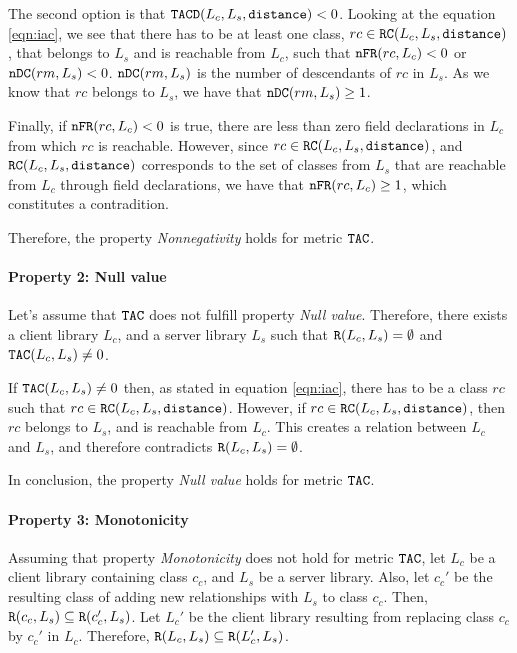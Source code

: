 The second option is that $\verb|TACD|(L_c,L_s, \verb|distance|) < 0$. Looking at the equation \ref{eqn:iac}, we see that there has to be at least one class, $rc \in \verb|RC|(L_c,L_s,\verb|distance|)$, that belongs to $L_s$ and is reachable from $L_c$, such that $\verb|nFR|(rc,L_c) < 0$ or $\verb|nDC|(rm, L_s) < 0$. $\verb|nDC|(rm, L_s)$ is the number of descendants of $rc$ in $L_s$. As we know that $rc$ belongs to $L_s$, we have that $\verb|nDC|(rm, L_s) \geq 1$.

Finally, if $\verb|nFR|(rc,L_c) < 0$ is true, there are less than zero field declarations in $L_c$ from which $rc$ is reachable. However, since $rc \in \verb|RC|(L_c,L_s,\verb|distance|)$, and $\verb|RC|(L_c,L_s,\verb|distance|)$ corresponds to the set of classes from $L_s$ that are reachable from $L_c$ through field declarations, we have that $\verb|nFR|(rc,L_c) \geq 1$, which constitutes a contradition.

Therefore, the property \textit{Nonnegativity} holds for metric $\verb|TAC|$.

\paragraph{Property 2: Null value}
Let's assume that $\verb|TAC|$ does not fulfill property \textit{Null value}. Therefore, there exists a client library $L_c$, and a server library $L_s$ such that $\verb|R|(L_c, L_s) = \emptyset$ and $\verb|TAC|(L_c, L_s) \neq 0$.

If $\verb|TAC|(L_c, L_s) \neq 0$ then, as stated in equation \ref{eqn:iac}, there has to be a class $rc$ such that  $rc \in \verb|RC|(L_c,L_s,\verb|distance|)$. However, if $rc \in \verb|RC|(L_c,L_s,\verb|distance|)$, then $rc$ belongs to $L_s$, and is reachable from $L_c$. This creates a relation between $L_c$ and $L_s$, and therefore contradicts $\verb|R|(L_c, L_s) = \emptyset$.

In conclusion, the property \textit{Null value} holds for metric $\verb|TAC|$.

\paragraph{Property 3: Monotonicity}
Assuming that property \textit{Monotonicity} does not hold for metric $\verb|TAC|$, let $L_c$ be a client library containing class $c_c$, and $L_s$ be a server library. Also, let $c_c'$ be the resulting class of adding new relationships with $L_s$ to class $c_c$. Then, $\verb|R|(c_c, L_s) \subseteq \verb|R|(c_c', L_s)$. Let $L_c'$ be the client library resulting from replacing class $c_c$ by $c_c'$ in $L_c$. Therefore, $\verb|R|(L_c, L_s) \subseteq \verb|R|(L_c', L_s)$.

